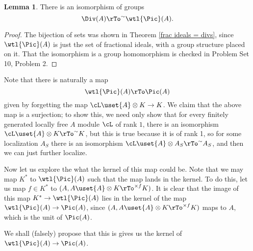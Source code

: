 \documentclass[12 pt]{article}
\theoremstyle{definition}
\newtheorem{lemma}[thm]{Lemma}
\renewcommand{\(}{\left(}
\renewcommand{\)}{\right)}
\begin{document}
\begin{lemma} There is an isomorphism of groups
\[\Div(A) \rTo^\sim \wtl{\Pic}(A).\]
\label{div is pictilde}
\end{lemma}
\begin{proof}
The bijection of sets was shown in Theorem \ref{frac ideals = divs}, since $\wtl{\Pic}(A)$ is just the set of fractional ideals, with a group structure placed on it. That the isomorphism is a group homomorphism is checked in Problem Set 10, Problem 2.
\end{proof}

Note that there is naturally a map
\[\wtl{\Pic}(A) \rTo \Pic(A)\]
given by forgetting the map $\cL \uset{A}\otimes K \to K$. We claim that the above map is a surjection; to show this, we need only show that for every finitely generated locally free $A$ module $\cL$ of rank $1$, there is an isomorphism $\cL \uset{A}\otimes K \rTo^\sim K$, but this is true because it is of rank 1, so for some localization $A_S$ there is an isomorphism $\cL \uset{A}\otimes A_S \rTo^\sim A_S$, and then we can just further localize.

Now let us explore the what the kernel of this map could be. Note that we may map $K^*$ to $\wtl{\Pic}(A)$ such that the map lands in the kernel. To do this, let us map $f \in K^*$ to $(A, A \uset{A}\otimes K \rTo^{\times f} K)$. It is clear that the image of this map $K^* \to \wtl{\Pic}(A)$ lies in the kernel of the map $\wtl{\Pic}(A) \to \Pic(A)$, since $(A, A \uset{A}\otimes K \rTo^{\times f} K)$ maps to $A$, which is the unit of $\Pic(A)$.

We shall (falsely) propose that this is gives us the kernel of $\wtl{\Pic}(A) \to \Pic(A)$.
\end{document}
